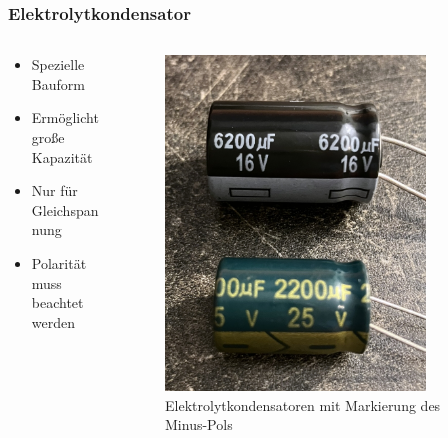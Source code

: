 \begin{frame}
\frametitle{Elektrolytkondensator}
\begin{columns}
    \begin{column}{0.48\textwidth}
    \begin{itemize}
  \item Spezielle Bauform
  \item Ermöglicht große Kapazität
  \item Nur für Gleichspannung
  \item Polarität muss beachtet werden
  \end{itemize}

    \end{column}
   \begin{column}{0.48\textwidth}
       
\begin{figure}
    \includegraphics[width=0.85\textwidth]{foto/198}
    \caption{\scriptsize Elektrolytkondensatoren mit Markierung des Minus-Pols}
    \label{e_kondensator_elkos}
\end{figure}

   \end{column}
\end{columns}

\end{frame}

